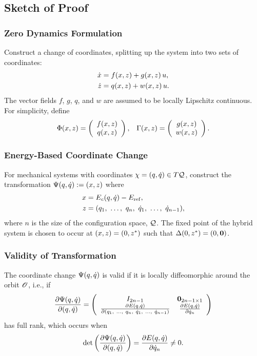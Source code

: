 \subsection{Sketch of Proof}

\begin{frame}[t]
  \frametitle{Zero Dynamics Formulation}
  Construct a change of coordinates, splitting up the system into two sets of coordinates:
  \begin{align*}
    \dot {x} &= f(x, z) + g(x, z) \, u,\\
    \dot {z} &= q(x, z) + w(x, z) \, u.
  \end{align*}
  The vector fields $f$, $g$, $q$, and $w$ are assumed to be locally Lipschitz
  continuous. For simplicity, define
  \begin{align*}
    \Phi(x, z) = \left(\begin{array}{c}
        f(x, z)\\
        q(x, z)
      \end{array}\right),&&
    \Gamma (x, z) = \left(\begin{array}{c}
        g(x, z)\\
        w(x, z)
      \end{array}\right).
  \end{align*}
\end{frame}

\begin{frame}[t]
  \frametitle{Energy-Based Coordinate Change}
  For mechanical systems with coordinates $\chi = (q, \dot q) \in T\mathcal{Q}$, construct the transformation $\Psi(q, \dot q) := (x, z)$ where
  \begin{align*}
    x &= E_{c}(q, \dot q) - E_{\mathrm{ref}},\\
    z &= (q_{1}, \ \ldots, \ q_{n}, \ \dot q_{1}, \ \ldots, \ \dot q_{n-1}),
  \end{align*}
  where $n$ is the size of the configuration space, $\mathcal{Q}$. The fixed point of the
  hybrid system is chosen to occur at $(x, z) = (0, z^{*})$ such that $\Delta(0, z^{*}) =
  (0, {\mathbf 0})$.
\end{frame}

\begin{frame}[t]
  \frametitle{Validity of Transformation}
  The coordinate change $\Psi(q, \dot q)$ is valid if it is locally diffeomorphic around the orbit
  $\mathscr O$, i.e., if
  \begin{align}
    \frac{\partial{\Psi(\ensuremath{q}, \ensuremath{\dot q})}}{\partial{(\ensuremath{q}, \ensuremath{\dot q})}} =
    \left(\begin{array}{c c}
        I_{2n-1} & {\mathbf 0}_{2n-1 \times 1}\\
        \frac{\partial{E(\ensuremath{q}, \ensuremath{\dot q})}}{\partial{(\ensuremath{q}_{1}, \ \ldots, \ q_{n}, \ \ensuremath{\dot q}_{1}, \ \ldots, \ \ensuremath{\dot q}_{n-1})}} & \frac{\partial{E(\ensuremath{q}, \ensuremath{\dot q})}}{\partial{\ensuremath{\dot q}_{n}}}
      \end{array}\right)
  \end{align}
  has full rank, which occurs when
  \begin{align*}
    \det\left(\frac{\partial{\Psi(\ensuremath{q}, \ensuremath{\dot q})}}{\partial{(\ensuremath{q}, \ensuremath{\dot q})}}\right) = \frac{\partial{E(\ensuremath{q}, \ensuremath{\dot q})}}{\partial{\ensuremath{\dot q}_{n}}} \ne 0.
  \end{align*}
\end{frame}

